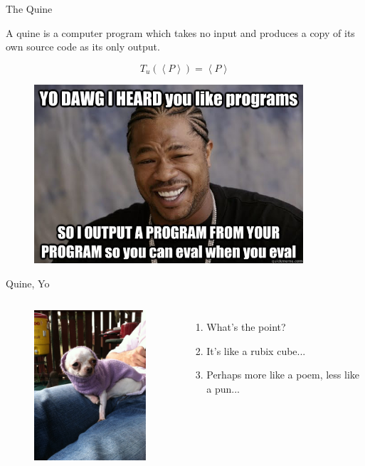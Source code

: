 \documentclass[pdf,14pt]{beamer}
\begin{document}
\begin{frame}{The Quine}
  \begin{definition}
    A quine is a computer program which takes no input and produces a copy of its own source code as its only output.
  \end{definition}

  \[
    T_u(\left< P \right>) = \left< P \right>
  \]  
\end{frame}

\begin{frame}
  \begin{figure}[ht]
    \begin{center}
      \includegraphics[width=10cm]{dawg.jpeg}
    \end{center}
  \end{figure}
\end{frame}

\begin{frame}{Quine, Yo}
  \begin{columns}
    \begin{figure}[ht]
      \begin{center}
        \includegraphics[width=5cm]{dog.jpeg}
      \end{center}
    \end{figure}

    \begin{enumerate}
    \item What's the point?
      \pause
    \item It's like a rubix cube...
      \pause
    \item Perhaps more like a poem, less like a pun...
    \end{enumerate}
  \end{columns}
\end{frame}
\end{document}
